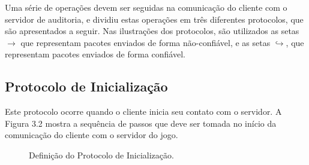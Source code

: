 Uma série de operações devem ser seguidas na comunicação do cliente com o servidor de auditoria, e \cite{NVE} dividiu estas operações em três diferentes protocolos, que são apresentados a seguir. Nas ilustrações dos protocolos, são utilizados as setas $\rightarrow$ que representam pacotes enviados de forma não-confiável, e as setas $\hookrightarrow$, que representam pacotes enviados de forma confiável.

\subsection{Protocolo de Inicialização}
\label{protocoloinicializacao}

Este protocolo ocorre quando o cliente inicia seu contato com o servidor. A Figura 3.2 mostra a sequência de passos que deve ser tomada no início da comunicação do cliente com o servidor do jogo.

\begin{figure}[h!]
	\begin{center}

	\end{center}
	\caption[Definição do Protocolo de Inicialização.]{Definição do Protocolo de Inicialização.}
	\label{fig:inicializar}	
	
\end{figure}

